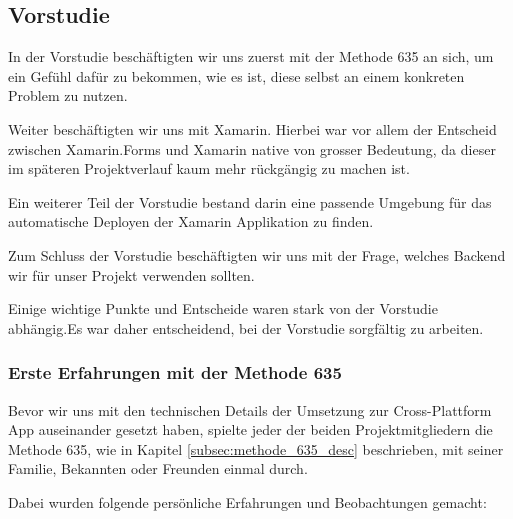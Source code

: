 \subsection{Vorstudie}
In der Vorstudie beschäftigten wir uns zuerst mit der Methode 635 an sich, um ein Gefühl dafür zu bekommen, wie es ist, diese selbst an einem konkreten Problem zu nutzen. 

Weiter beschäftigten wir uns mit Xamarin. Hierbei war vor allem der Entscheid zwischen Xamarin.Forms und Xamarin native von grosser Bedeutung, da dieser im späteren Projektverlauf kaum mehr rückgängig zu machen ist.

Ein weiterer Teil der Vorstudie bestand darin eine passende Umgebung  für das automatische Deployen der Xamarin Applikation zu finden. 

Zum Schluss der Vorstudie beschäftigten wir uns mit der Frage, welches Backend wir für unser Projekt verwenden sollten.

Einige wichtige Punkte und Entscheide waren stark von der Vorstudie abhängig.Es war daher entscheidend, bei der Vorstudie sorgfältig zu arbeiten.


\subsubsection{Erste Erfahrungen mit der Methode 635} \label{subsub:erste_erfahrungen_mit_methode_635}
Bevor wir uns mit den technischen Details der Umsetzung zur Cross-Plattform App auseinander gesetzt haben, spielte jeder der beiden Projektmitgliedern die Methode 635, wie in Kapitel \ref{subsec:methode_635_desc} beschrieben, mit seiner Familie, Bekannten oder Freunden einmal durch. 

Dabei wurden folgende persönliche Erfahrungen und Beobachtungen gemacht:

